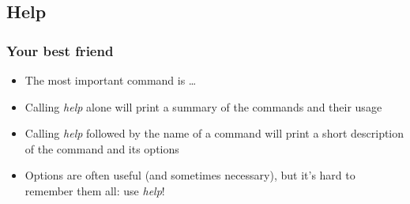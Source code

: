\documentclass{beamer}
\begin{document}
\subsection{Help}

\frame
{
  \frametitle{Your best friend}
  
  \begin{itemize}
  \item<1-> The most important command is \dots
  		  \uncover<2->{\textit{help}}
  \item<3-> Calling \textit{help} alone will print a summary of the commands and their usage
  \item<4-> Calling \textit{help} followed by the name of a command will print a short description of the command and its options
  \item<5-> Options are often useful (and sometimes necessary), but it's hard to remember them all: use \textit{help}!
  \end{itemize}

}
\end{document}

